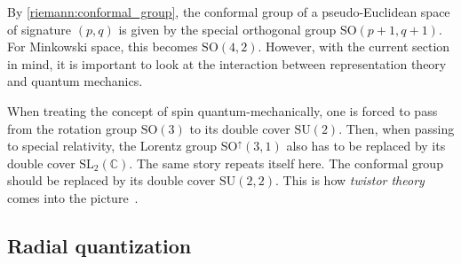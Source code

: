     By \cref{riemann:conformal_group}, the conformal group of a pseudo-Euclidean space of signature $(p,q)$ is given by the special orthogonal group $\mathrm{SO}(p+1,q+1)$. For Minkowski space, this becomes $\mathrm{SO}(4,2)$. However, with the current section in mind, it is important to look at the interaction between representation theory and quantum mechanics.

    When treating the concept of spin quantum-mechanically, one is forced to pass from the rotation group $\mathrm{SO}(3)$ to its double cover $\mathrm{SU}(2)$. Then, when passing to special relativity, the Lorentz group $\mathrm{SO}^\uparrow(3,1)$ also has to be replaced by its double cover $\mathrm{SL}_2(\mathbb{C})$. The same story repeats itself here. The conformal group should be replaced by its double cover $\mathrm{SU}(2,2)$. This is how \textit{twistor theory} comes into the picture~\citep{penrose_twistor_1967}.

\subsection{Radial quantization}

